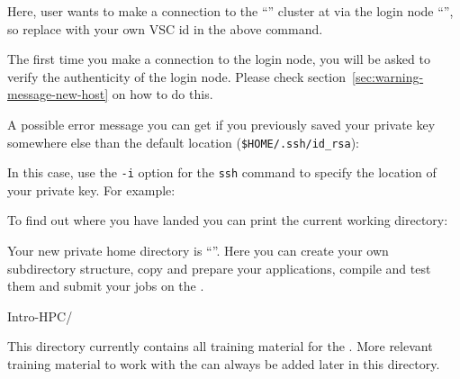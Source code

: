 \begin{prompt}
\end{prompt}

  Here, user \userid wants to make a connection to the ``\hpcname'' cluster at
  \university via the login node ``\loginnode'', so replace \userid with your own
  VSC id in the above command.

  The first time you make a connection to the login node, you will be asked to
  verify the authenticity of the login node. Please check section~\ref{sec:warning-message-new-host}
  on how to do this.

A possible error message you can get if you previously saved your private key
somewhere else than the default location (\lstinline|$HOME/.ssh/id_rsa|):

\begin{prompt}
\end{prompt}

In this case, use the \lstinline|-i| option for the \lstinline|ssh| command to specify the location
of your private key. For example:

\begin{prompt}
\end{prompt}

\fi

To find out where you have landed you can print the current working directory:

\begin{prompt}
\end{prompt}


Your new private home directory is ``\homedir''.
Here you can create your own subdirectory structure, copy and prepare your
applications, compile and test them and submit your jobs on the \hpc.

\begin{prompt}
Intro-HPC/
\end{prompt}

This directory currently contains all training material for the .
More relevant training material to work with the \hpc can always be added
later in this directory.


